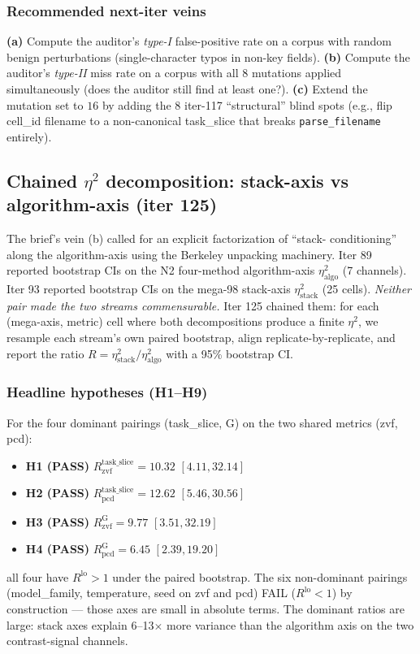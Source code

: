 \documentclass{article}  \usepackage[preprint,nonatbib]{neurips_2026} \usepackage[numbers]{natbib}
\begin{document}
\subsubsection{Recommended next-iter veins}

\textbf{(a)} Compute the auditor's \emph{type-I} false-positive rate
on a corpus with random benign perturbations (single-character typos
in non-key fields). \textbf{(b)} Compute the auditor's \emph{type-II}
miss rate on a corpus with all $8$ mutations applied simultaneously
(does the auditor still find at least one?). \textbf{(c)} Extend the
mutation set to $16$ by adding the $8$ iter-117 ``structural'' blind
spots (e.g., flip cell\_id filename to a non-canonical task\_slice that
breaks \texttt{parse\_filename} entirely). \subsection{Chained $\eta^2$ decomposition: stack-axis vs algorithm-axis (iter 125)}
\label{sec:p5-iter125-chained-eta2}

The brief's vein (b) called for an explicit factorization of ``stack-
conditioning'' along the algorithm-axis using the Berkeley unpacking
machinery. Iter 89 reported bootstrap CIs on the N2 four-method
algorithm-axis $\eta^2_{\mathrm{algo}}$ (7 channels). Iter 93 reported
bootstrap CIs on the mega-98 stack-axis $\eta^2_{\mathrm{stack}}$ (25
cells). \emph{Neither pair made the two streams commensurable.} Iter 125
chained them: for each (mega-axis, metric) cell where both
decompositions produce a finite $\eta^2$, we resample each stream's
own paired bootstrap, align replicate-by-replicate, and report the
ratio $R = \eta^2_{\mathrm{stack}} / \eta^2_{\mathrm{algo}}$ with a 95\%
bootstrap CI.

\subsubsection{Headline hypotheses (H1--H9)}
\label{sec:p5-iter125-headlines}
For the four dominant pairings (task\_slice, G) on the two shared
metrics (zvf, pcd):
\begin{itemize}
\item \textbf{H1 (PASS)} $R_{\mathrm{zvf}}^{\mathrm{task\_slice}} = 10.32$ $[4.11, 32.14]$
\item \textbf{H2 (PASS)} $R_{\mathrm{pcd}}^{\mathrm{task\_slice}} = 12.62$ $[5.46, 30.56]$
\item \textbf{H3 (PASS)} $R_{\mathrm{zvf}}^{\mathrm{G}} = 9.77$ $[3.51, 32.19]$
\item \textbf{H4 (PASS)} $R_{\mathrm{pcd}}^{\mathrm{G}} = 6.45$ $[2.39, 19.20]$
\end{itemize}
all four have $R^{\mathrm{lo}} > 1$ under the paired bootstrap. The
six non-dominant pairings (model\_family, temperature, seed on zvf
and pcd) FAIL ($R^{\mathrm{lo}} < 1$) by construction --- those axes
are small in absolute terms. The dominant ratios are large: stack
axes explain 6--13$\times$ more variance than the algorithm axis on
the two contrast-signal channels.
\end{document}
